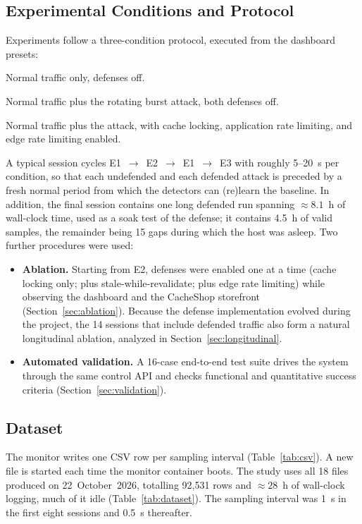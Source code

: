 \documentclass[preprint,12pt]{elsarticle}
\begin{document}
\subsection{Experimental Conditions and Protocol}
Experiments follow a three-condition protocol, executed from the dashboard presets:
\begin{description}[leftmargin=1.2em,style=nextline]
\item[E1 -- Baseline.] Normal traffic only, defenses off.
\item[E2 -- Attack, undefended.] Normal traffic plus the rotating burst attack, both
defenses off.
\item[E3 -- Attack, defended.] Normal traffic plus the attack, with cache locking,
application rate limiting, and edge rate limiting enabled.
\end{description}
A typical session cycles E1~$\rightarrow$~E2~$\rightarrow$~E1~$\rightarrow$~E3 with
roughly 5--20~s per condition, so that each undefended and each defended attack is
preceded by a fresh normal period from which the detectors can (re)learn the
baseline. In addition, the final session contains one long defended run spanning
${\approx}8.1$~h of wall-clock time, used as a soak test of the defense; it contains
4.5~h of valid samples, the remainder being 15 gaps during which the host was asleep.
Two further procedures were used:
\begin{itemize}[leftmargin=*]
\item \textbf{Ablation.} Starting from E2, defenses were enabled one at a time (cache
locking only; plus stale-while-revalidate; plus edge rate limiting) while observing the
dashboard and the CacheShop storefront (Section~\ref{sec:ablation}). Because the
defense implementation evolved during the project, the 14 sessions that include
defended traffic also form a natural longitudinal ablation, analyzed in
Section~\ref{sec:longitudinal}.
\item \textbf{Automated validation.} A 16-case end-to-end test suite drives the system
through the same control API and checks functional and quantitative success criteria
(Section~\ref{sec:validation}).
\end{itemize}

\subsection{Dataset}
The monitor writes one CSV row per sampling interval (Table~\ref{tab:csv}). A new file
is started each time the monitor container boots. The study uses all 18 files produced
on 22~October~2026, totalling 92{,}531 rows and ${\approx}28$~h of wall-clock logging,
much of it idle (Table~\ref{tab:dataset}). The sampling interval was 1~s in the first
eight sessions and 0.5~s thereafter.
\end{document}
